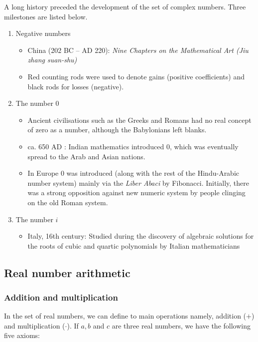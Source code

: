 \ifanalysis
\begin{remark}
	A long history preceded the development of the set of complex numbers. Three milestones are listed below.
	\begin{enumerate}
		\item Negative numbers
		\begin{itemize}
			\item China (202 BC -- AD 220): \textit{Nine Chapters on the Mathematical Art (Jiu zhang suan-shu)}
			\item Red counting rods were used to denote gains (positive coefficients) and black rods for losses (negative).
		\end{itemize}
		\item The number $0$
		\begin{itemize}
			\item Ancient civilisations such as the Greeks and Romans had no real concept of zero as a number, although the Babylonians left blanks.
			\item ca. 650 AD : Indian mathematics introduced 0, which was eventually spread to the Arab and Asian nations.
			\item In Europe 0 was introduced (along with the rest of the Hindu-Arabic number system) mainly via the \textit{Liber Abaci} by Fibonacci. Initially, there was a strong opposition against new numeric system by people clinging on the old Roman system.
		\end{itemize} 
		\item The number $i$
		\begin{itemize}
			\item Italy, 16th century: Studied during the discovery of algebraic solutions for the roots of cubic and quartic polynomials by Italian mathematicians
		\end{itemize}
	\end{enumerate}
\end{remark}
\fi



\subsection{Real number arithmetic}
\label{sec_real_number}
\subsubsection{Addition and multiplication}
In the set of real numbers, we can define to main operations namely, addition ($+$) and multiplication ($\cdot$). If $a, b$ and $c$ are three real numbers, we have the following five axioms:

